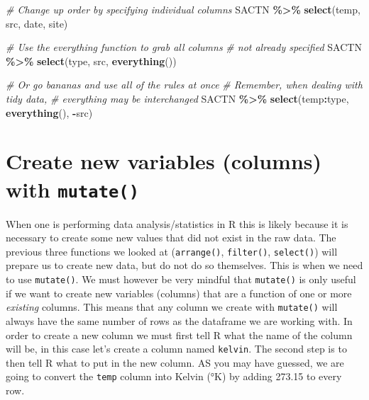 \documentclass[
]{book}
\newenvironment{Shaded}{\begin{snugshade}}{\end{snugshade}}
\newcommand{\CommentTok}[1]{\textcolor[rgb]{0.56,0.35,0.01}{\textit{#1}}}
\newcommand{\KeywordTok}[1]{\textcolor[rgb]{0.13,0.29,0.53}{\textbf{#1}}}
\newcommand{\NormalTok}[1]{#1}
\newcommand{\OperatorTok}[1]{\textcolor[rgb]{0.81,0.36,0.00}{\textbf{#1}}}
\newcommand{\StringTok}[1]{\textcolor[rgb]{0.31,0.60,0.02}{#1}}
\begin{document}
\begin{Shaded}
\begin{Highlighting}[]
\CommentTok{\# Change up order by specifying individual columns}
\NormalTok{SACTN }\OperatorTok{\%>\%}\StringTok{ }
\StringTok{  }\KeywordTok{select}\NormalTok{(temp, src, date, site)}

\CommentTok{\# Use the everything function to grab all columns }
\CommentTok{\# not already specified}
\NormalTok{SACTN }\OperatorTok{\%>\%}\StringTok{ }
\StringTok{  }\KeywordTok{select}\NormalTok{(type, src, }\KeywordTok{everything}\NormalTok{())}

\CommentTok{\# Or go bananas and use all of the rules at once}
  \CommentTok{\# Remember, when dealing with tidy data,}
  \CommentTok{\# everything may be interchanged}
\NormalTok{SACTN }\OperatorTok{\%>\%}\StringTok{ }
\StringTok{  }\KeywordTok{select}\NormalTok{(temp}\OperatorTok{:}\NormalTok{type, }\KeywordTok{everything}\NormalTok{(), }\OperatorTok{{-}}\NormalTok{src)}
\end{Highlighting}
\end{Shaded}

\hypertarget{create-new-variables-columns-with-mutate}{%
\section{\texorpdfstring{Create new variables (columns) with \texttt{mutate()}}{Create new variables (columns) with mutate()}}\label{create-new-variables-columns-with-mutate}}

When one is performing data analysis/statistics in R this is likely because it is necessary to create some new values that did not exist in the raw data. The previous three functions we looked at (\texttt{arrange()}, \texttt{filter()}, \texttt{select()}) will prepare us to create new data, but do not do so themselves. This is when we need to use \texttt{mutate()}. We must however be very mindful that \texttt{mutate()} is only useful if we want to create new variables (columns) that are a function of one or more \emph{existing} columns. This means that any column we create with \texttt{mutate()} will always have the same number of rows as the dataframe we are working with. In order to create a new column we must first tell R what the name of the column will be, in this case let's create a column named \texttt{kelvin}. The second step is to then tell R what to put in the new column. AS you may have guessed, we are going to convert the \texttt{temp} column into Kelvin (°K) by adding 273.15 to every row.
\end{document}
